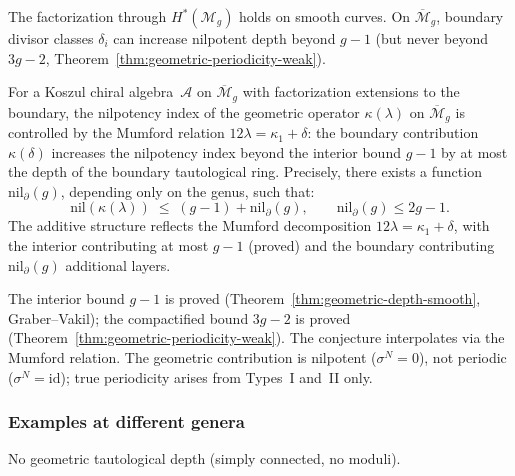 \begin{remark}
\label{rem:factorization-hypothesis-geom}
The factorization through $H^*(\mathcal{M}_g)$ holds on smooth
curves. On $\overline{\mathcal{M}}_g$, boundary divisor classes
$\delta_i$ can increase nilpotent depth beyond $g-1$ (but never
beyond $3g-2$, Theorem~\ref{thm:geometric-periodicity-weak}).
\end{remark}

\begin{conjecture}
\label{conj:geometric-periodicity}
For a Koszul chiral algebra~$\mathcal{A}$
on $\overline{\mathcal{M}}_g$
with factorization extensions to the boundary, the nilpotency
index of the geometric operator $\kappa(\lambda)$ on
$\overline{\mathcal{M}}_g$ is controlled by the Mumford
relation $12\lambda = \kappa_1 + \delta$:
the boundary contribution $\kappa(\delta)$ increases the
nilpotency index beyond the interior bound $g - 1$ by at most
the depth of the boundary tautological ring. Precisely, there
exists a function $\mathrm{nil}_{\partial}(g)$, depending only
on the genus, such that:
\[
\mathrm{nil}(\kappa(\lambda)) \;\leq\; (g-1) + \mathrm{nil}_{\partial}(g),
\qquad \mathrm{nil}_{\partial}(g) \leq 2g - 1.
\]
The additive structure reflects the Mumford decomposition
$12\lambda = \kappa_1 + \delta$, with the interior contributing
at most $g - 1$ (proved) and the boundary contributing
$\mathrm{nil}_{\partial}(g)$ additional layers.
\end{conjecture}

\begin{remark}\label{rem:geometric-periodicity-scope}
The interior bound $g-1$ is proved
(Theorem~\ref{thm:geometric-depth-smooth}, Graber--Vakil); the
compactified bound $3g-2$ is proved
(Theorem~\ref{thm:geometric-periodicity-weak}). The conjecture
interpolates via the Mumford relation. The geometric contribution
is nilpotent ($\sigma^N = 0$), not periodic ($\sigma^N = \mathrm{id}$);
true periodicity arises from Types~I and~II only.
\end{remark}

\subsubsection{Examples at different genera}

\begin{example}
No geometric tautological depth (simply connected, no moduli).
\end{example}

